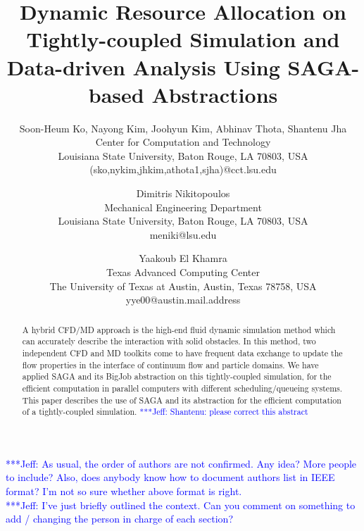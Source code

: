 \documentclass[times, 10pt,twocolumn]{article}
\newcommand{\skonote}[1]{ {\textcolor{blue} { ***Jeff: #1 }}}
\newcommand{\skonote}[1]{}
\begin{document}
\title{Dynamic Resource Allocation on Tightly-coupled Simulation and Data-driven Analysis Using SAGA-based Abstractions}

\author{Soon-Heum Ko, Nayong Kim, Joohyun Kim, Abhinav Thota, Shantenu Jha\\
Center for Computation and Technology\\
Louisiana State University, Baton Rouge, LA 70803, USA\\
(sko,nykim,jhkim,athota1,sjha)@cct.lsu.edu\\
\and
Dimitris Nikitopoulos\\
Mechanical Engineering Department\\
Louisiana State University, Baton Rouge, LA 70803, USA\\
meniki@lsu.edu\\
\and
Yaakoub El Khamra\\
Texas Advanced Computing Center\\
The University of Texas at Austin, Austin, Texas 78758, USA\\
yye00@austin.mail.address\\
}


\maketitle
\thispagestyle{empty}

\begin{abstract}
   A hybrid CFD/MD approach is the high-end fluid dynamic simulation method which can accurately describe the interaction with solid obstacles. In this method, two independent CFD and MD toolkits come to have frequent data exchange to update the flow properties in the interface of continuum flow and particle domains. We have applied SAGA and its BigJob abstraction on this tightly-coupled simulation, for the efficient computation in parallel computers with different scheduling/queueing systems. This paper describes the use of SAGA and its abstraction for the efficient computation of a tightly-coupled simulation.
\skonote{Shantenu: please correct this abstract}
\end{abstract}

\skonote{As usual, the order of authors are not confirmed. Any idea? More people to include? Also, does anybody know how to document authors list in IEEE format? I'm not so sure whether above format is right.}\\
\skonote{I've just briefly outlined the context. Can you comment on something to add / changing the person in charge of each section?}
\end{document}
